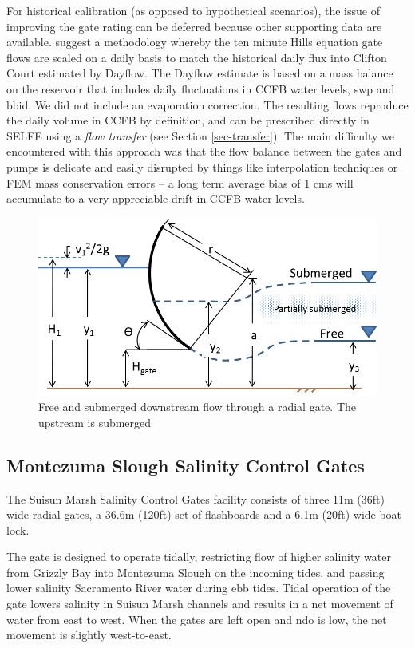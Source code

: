 For historical calibration (as opposed to hypothetical scenarios), the issue of improving the gate rating can be deferred because other supporting data are available. \citet{MacWilliams13} suggest a methodology whereby the ten minute Hills equation gate flows are scaled on a daily basis to match the historical daily flux into Clifton Court estimated by Dayflow. The Dayflow estimate is based on a mass balance on the reservoir that includes daily fluctuations in CCFB water levels, \gls{swp} and \gls{bbid}. We did not include an evaporation correction. The resulting flows reproduce the daily volume in CCFB by definition, and can be prescribed directly in SELFE using a {\em flow transfer} (see Section \ref{sec-transfer}). The main difficulty we encountered with this approach was that the flow balance between the gates and pumps is delicate and easily disrupted by things like interpolation techniques or FEM mass conservation errors -- a long term average bias of 1 cms will accumulate to a very appreciable drift in CCFB water levels.

\begin{figure}
	\centering
		\includegraphics{image/radial_gate}
	\caption{Free and submerged downstream flow through a radial gate. The upstream is submerged}
	\label{fig:radial_gate}
\end{figure}


\subsection{Montezuma Slough Salinity Control Gates}
The Suisun Marsh Salinity Control Gates facility consists of three 11m (36ft) wide radial gates, a 36.6m (120ft) set of
flashboards and a 6.1m (20ft) wide boat lock. 

The gate is designed to operate tidally, restricting flow of higher salinity water 
from Grizzly Bay into Montezuma Slough on the incoming tides, and passing lower salinity 
Sacramento River water during ebb tides. Tidal operation of the gate lowers salinity 
in Suisun Marsh channels and results in a net movement of water from east to west. When the gates
 are left open and \gls{ndo} is low, the net movement is slightly west-to-east.

